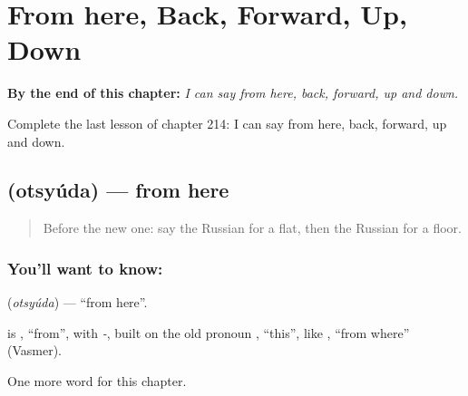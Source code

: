 
\chapter{From here, Back, Forward, Up, Down}
\label{ch:ru-from-here-back-forward-up-down}

\begin{chapteropening}
\textbf{By the end of this chapter:} \emph{I can say from here, back, forward, up and down.}

Complete the last lesson of chapter 214: I can say from here, back, forward, up and down.
\end{chapteropening}

\section[\texorpdfstring{\ru{отсюда} (otsyúda)}{отсюда (otsyúda)}]{ (otsyúda) — from here}

\label{lesson:RU-C214-otsyuda}



\begin{quote}
Before the new one: say the Russian for a flat, then the Russian for a floor.
\end{quote}

\subsection*{You'll want to know: }
\textbf{} (\emph{otsyúda}) — \textquotedblleft{}from here\textquotedblright{}.

\begin{cousinweb}
\textbf{} is \emph{}, \textquotedblleft{}from\textquotedblright{}, with \emph{-}, built on the old pronoun \emph{}, \textquotedblleft{}this\textquotedblright{}, like \emph{}, \textquotedblleft{}from where\textquotedblright{} (Vasmer).
\end{cousinweb}

\begin{grammarlens}[title={What you've built}]
One more word for this chapter.
\end{grammarlens}

